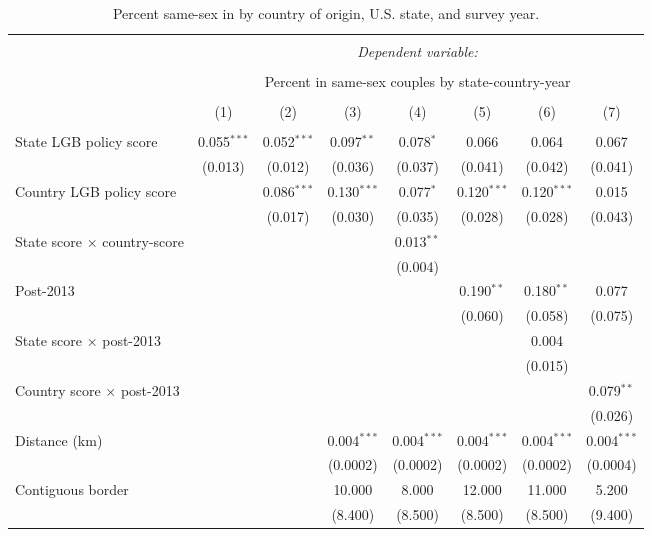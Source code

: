 \documentclass[
  11pt,
]{article}
\begin{document}
\begin{table}[H] \centering 
  \caption{Percent same-sex in by country of origin, U.S. state, and survey year.} 
  \label{tab:state-props-full} 
\footnotesize 
\begin{tabular}{@{\extracolsep{2pt}}lccccccc} 
\\[-1.8ex]\hline 
\hline \\[-1.8ex] 
 & \multicolumn{7}{c}{\textit{Dependent variable:}} \\ 
\cline{2-8} 
\\[-1.8ex] & \multicolumn{7}{c}{Percent in same-sex couples by state-country-year} \\ 
\\[-1.8ex] & (1) & (2) & (3) & (4) & (5) & (6) & (7)\\ 
\hline \\[-1.8ex] 
 State LGB policy score & 0.055$^{***}$ & 0.052$^{***}$ & 0.097$^{**}$ & 0.078$^{*}$ & 0.066 & 0.064 & 0.067 \\ 
  & (0.013) & (0.012) & (0.036) & (0.037) & (0.041) & (0.042) & (0.041) \\ 
  Country LGB policy score &  & 0.086$^{***}$ & 0.130$^{***}$ & 0.077$^{*}$ & 0.120$^{***}$ & 0.120$^{***}$ & 0.015 \\ 
  &  & (0.017) & (0.030) & (0.035) & (0.028) & (0.028) & (0.043) \\ 
  State score × country-score &  &  &  & 0.013$^{**}$ &  &  &  \\ 
  &  &  &  & (0.004) &  &  &  \\ 
  Post-2013 &  &  &  &  & 0.190$^{**}$ & 0.180$^{**}$ & 0.077 \\ 
  &  &  &  &  & (0.060) & (0.058) & (0.075) \\ 
  State score × post-2013 &  &  &  &  &  & 0.004 &  \\ 
  &  &  &  &  &  & (0.015) &  \\ 
  Country score × post-2013 &  &  &  &  &  &  & 0.079$^{**}$ \\ 
  &  &  &  &  &  &  & (0.026) \\ 
  Distance (km) &  &  & 0.004$^{***}$ & 0.004$^{***}$ & 0.004$^{***}$ & 0.004$^{***}$ & 0.004$^{***}$ \\ 
  &  &  & (0.0002) & (0.0002) & (0.0002) & (0.0002) & (0.0004) \\ 
  Contiguous border &  &  & 10.000 & 8.000 & 12.000 & 11.000 & 5.200 \\ 
  &  &  & (8.400) & (8.500) & (8.500) & (8.500) & (9.400) \\ 

\end{tabular}
\end{table}
\end{document}
